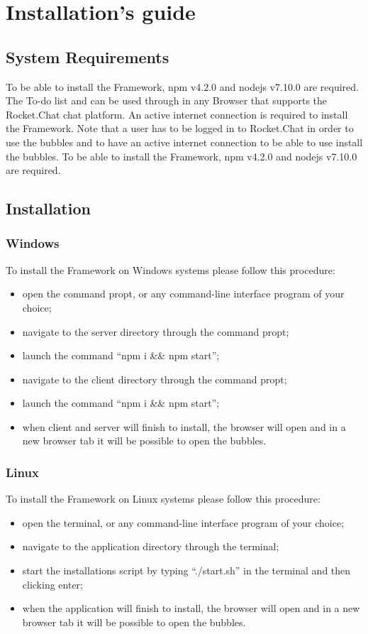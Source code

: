 \section{Installation's guide}

\subsection{System Requirements}
To be able to install the Framework, npm v4.2.0 and nodejs v7.10.0 are required.
The To-do list and \DemoName{} can be used through  in any Browser that supports the Rocket.Chat chat platform.
An active internet connection is required to install the Framework.
Note that a user has to be logged in to Rocket.Chat in order to use the bubbles and to have an active internet connection to be able to use install the bubbles.
To be able to install the Framework, npm v4.2.0 and nodejs v7.10.0 are required.

\subsection{Installation}

\subsubsection{Windows}
To install the Framework on Windows systems please follow this procedure:
\begin{itemize}
	\item open the command propt, or any command-line interface program of your choice;
	\item navigate to the server directory through the command propt;
	\item launch the command ``npm i \&\& npm start'';
	\item navigate to the client directory through the command propt;
	\item launch the command ``npm i \&\& npm start'';
	\item when client and server will finish to install, the browser will open and in a new browser tab it will be possible to open the bubbles.
\end{itemize}



\subsubsection{Linux}
To install the Framework on Linux systems please follow this procedure:
\begin{itemize}
	\item open the terminal, or any command-line interface program of your choice;
	\item navigate to the application directory through the terminal; 
	\item start the installations script by typing ``./start.sh'' in the terminal and then clicking enter;
	\item when the application will finish to install, the browser will open and in a new browser tab it will be possible to open the bubbles.
\end{itemize}

